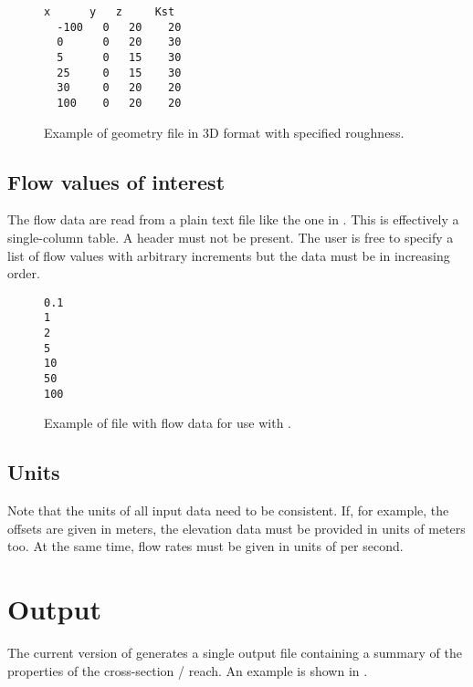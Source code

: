 \begin{figure}
\begin{lstlisting}[style=txt]
  x      y   z     Kst
  -100   0   20    20
  0      0   20    30
  5      0   15    30
  25     0   15    30
  30     0   20    20
  100    0   20    20
\end{lstlisting}
  \caption{Example of geometry file in 3D format with specified roughness. \label{fig:xsanalyzer:input:geometry-3D-withRoughness}}
\end{figure}

\subsection{Flow values of interest} \label{sec:xsanalyzer:input:flows}
The flow data are read from a plain text file like the one in . This is effectively a single-column table. A header must not be present. The user is free to specify a list of flow values with arbitrary increments but the data must be in increasing order.

\begin{figure}
\begin{lstlisting}[style=txt]
0.1
1
2
5
10
50
100
\end{lstlisting}
  \caption{Example of file with flow data for use with . \label{fig:xsanalyzer:input:flows}}
\end{figure}

\subsection{Units} \label{sec:xsanalyzer:input:units}
Note that the units of all input data need to be consistent. If, for example, the offsets are given in meters, the elevation data must be provided in units of meters too. At the same time, flow rates must be given in units of \cbm{} per second.

\section{Output} \label{sec:xsanalyzer:output}
The current version of  generates a single output file containing a summary of the properties of the cross-section / reach. An example is shown in .

